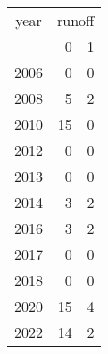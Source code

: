 \footnotesize\begin{tabular}[t]{lrr}
\toprule
\multicolumn{1}{c}{year} & \multicolumn{2}{c}{runoff} \\
\cmidrule(l{3pt}r{3pt}){1-1} \cmidrule(l{3pt}r{3pt}){2-3}
  & 0 & 1\\
\midrule
2006 & 0 & 0\\
2008 & 5 & 2\\
2010 & 15 & 0\\
2012 & 0 & 0\\
2013 & 0 & 0\\
2014 & 3 & 2\\
2016 & 3 & 2\\
2017 & 0 & 0\\
2018 & 0 & 0\\
2020 & 15 & 4\\
2022 & 14 & 2\\
\bottomrule
\end{tabular}
